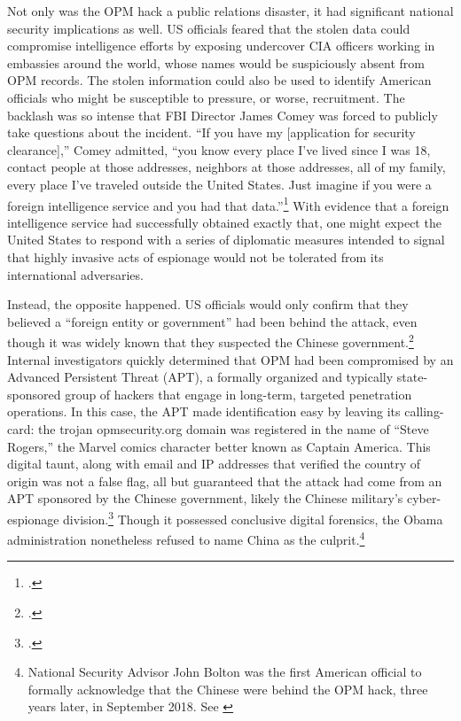 \documentclass[14pt]{extarticle}
\begin{document}
Not only was the OPM hack a public relations disaster, it had significant national security implications as well. US officials feared that the stolen data could compromise intelligence efforts by exposing undercover CIA officers working in embassies around the world, whose names would be suspiciously absent from OPM records. The stolen information could also be used to identify American officials who might be susceptible to pressure, or worse, recruitment. The backlash was so intense that FBI Director James Comey was forced to publicly take questions about the incident. \enquote{If you have my [application for security clearance],} Comey admitted, ``you know every place I've lived since I was 18, contact people at those addresses, neighbors at those addresses, all of my family, every place I've traveled outside the United States. Just imagine if you were a foreign intelligence service and you had that data.''\footcite{nakashima_hacks_2015} With evidence that a foreign intelligence service had successfully obtained exactly that, one might expect the United States to respond with a series of diplomatic measures intended to signal that highly invasive acts of espionage would not be tolerated from its international adversaries.

Instead, the opposite happened. US officials would only confirm that they believed a \enquote{foreign entity or government} had been behind the attack, even though it was widely known that they suspected the Chinese government.\footcite{spetalnick_china_2015} Internal investigators quickly determined that OPM had been compromised by an Advanced Persistent Threat (APT), a formally organized and typically state-sponsored group of hackers that engage in long-term, targeted penetration operations. In this case, the APT made identification easy by leaving its calling-card: the trojan opmsecurity.org domain was registered in the name of \enquote{Steve Rogers,} the Marvel comics character better known as Captain America. This digital taunt, along with email and IP addresses that verified the country of origin was not a false flag, all but guaranteed that the attack had come from an APT sponsored by the Chinese government, likely the Chinese military's cyber-espionage division.\footcite{koerner_inside_2016} Though it possessed conclusive digital forensics, the Obama administration nonetheless refused to name China as the culprit.\footnote{National Security Advisor John Bolton was the first American official to formally acknowledge that the Chinese were behind the OPM hack, three years later, in September 2018. See \cite{sanger_trump_2018}}
\end{document}

